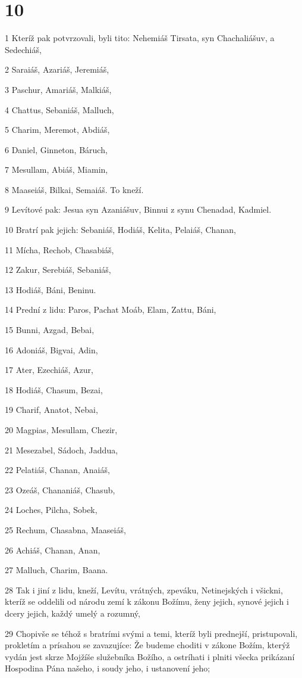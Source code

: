 \chapter{10}

\par 1 Kteríž pak potvrzovali, byli tito: Nehemiáš Tirsata, syn Chachaliášuv, a Sedechiáš,
\par 2 Saraiáš, Azariáš, Jeremiáš,
\par 3 Paschur, Amariáš, Malkiáš,
\par 4 Chattus, Sebaniáš, Malluch,
\par 5 Charim, Meremot, Abdiáš,
\par 6 Daniel, Ginneton, Báruch,
\par 7 Mesullam, Abiáš, Miamin,
\par 8 Maaseiáš, Bilkai, Semaiáš. To kneží.
\par 9 Levítové pak: Jesua syn Azaniášuv, Binnui z synu Chenadad, Kadmiel.
\par 10 Bratrí pak jejich: Sebaniáš, Hodiáš, Kelita, Pelaiáš, Chanan,
\par 11 Mícha, Rechob, Chasabiáš,
\par 12 Zakur, Serebiáš, Sebaniáš,
\par 13 Hodiáš, Báni, Beninu.
\par 14 Prední z lidu: Paros, Pachat Moáb, Elam, Zattu, Báni,
\par 15 Bunni, Azgad, Bebai,
\par 16 Adoniáš, Bigvai, Adin,
\par 17 Ater, Ezechiáš, Azur,
\par 18 Hodiáš, Chasum, Bezai,
\par 19 Charif, Anatot, Nebai,
\par 20 Magpias, Mesullam, Chezir,
\par 21 Mesezabel, Sádoch, Jaddua,
\par 22 Pelatiáš, Chanan, Anaiáš,
\par 23 Ozeáš, Chananiáš, Chasub,
\par 24 Loches, Pilcha, Sobek,
\par 25 Rechum, Chasabna, Maaseiáš,
\par 26 Achiáš, Chanan, Anan,
\par 27 Malluch, Charim, Baana.
\par 28 Tak i jiní z lidu, kneží, Levítu, vrátných, zpeváku, Netinejských i všickni, kteríž se oddelili od národu zemí k zákonu Božímu, ženy jejich, synové jejich i dcery jejich, každý umelý a rozumný,
\par 29 Chopivše se téhož s bratrími svými a temi, kteríž byli prednejší, pristupovali, prokletím a prísahou se zavazujíce: Že budeme choditi v zákone Božím, kterýž vydán jest skrze Mojžíše služebníka Božího, a ostríhati i plniti všecka prikázaní Hospodina Pána našeho, i soudy jeho, i ustanovení jeho;
